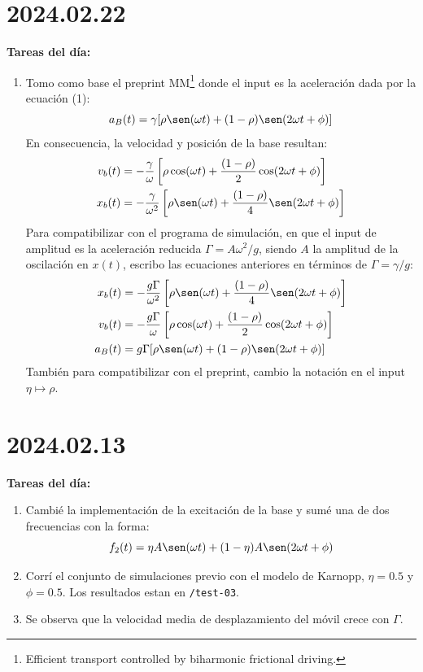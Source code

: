 \documentclass[11pt]{article}
\begin{document}
\section*{2024.02.22}
\textbf{Tareas del día:}
\begin{enumerate}
    \item Tomo como base el preprint MM\footnote{Efficient transport controlled by biharmonic frictional driving.} donde el input es la aceleración dada por la ecuación (1):
        \[ a_B(t) = \gamma [ \rho \sen(\omega t) + (1-\rho) \sen(2 \omega t + \phi)] \]
        En consecuencia, la velocidad y posición de la base resultan:
        \begin{align*}
            v_b(t) &= -\frac{\gamma}{\omega} \left[\rho \cos(\omega t) + \frac{(1 - \rho)}{2} \cos(2 \omega t + \phi)\right] \\
            x_b(t) &= -\frac{\gamma}{\omega^2} \left[ \rho \sen(\omega t) + \frac{(1 - \rho)}{4} \sen(2 \omega t + \phi) \right] 
        \end{align*}
        Para compatibilizar con el programa de simulación, en que el input de amplitud es la aceleración reducida $\Gamma = A \omega^2 / g$, siendo $A$ la amplitud de la oscilación en $x(t)$, escribo las ecuaciones anteriores en términos de $\Gamma = \gamma / g$:
        \begin{align*}
            x_b(t) &= -\frac{g \Gamma}{\omega^2} \left[ \rho \sen(\omega t) + \frac{(1 - \rho)}{4} \sen(2 \omega t + \phi) \right] \\
            v_b(t) &= -\frac{g \Gamma}{\omega} \left[\rho \cos(\omega t) + \frac{(1 - \rho)}{2} \cos(2 \omega t + \phi)\right] \\
            a_B(t) &= g \Gamma [ \rho \sen(\omega t) + (1-\rho) \sen(2 \omega t + \phi)] 
        \end{align*}
        También para compatibilizar con el preprint, cambio la notación en el input $\eta \mapsto \rho$.
\end{enumerate}


\section*{2024.02.13}
\textbf{Tareas del día:}
\begin{enumerate}
    \item Cambié la implementación de la excitación de la base y sumé una de dos frecuencias con la forma:
        \[ f_2(t) = \eta A \sen(\omega t) + (1 - \eta) A \sen(2 \omega t + \phi) \]
    \item Corrí el conjunto de simulaciones previo con el modelo de Karnopp, $\eta = 0.5$ y $\phi = 0.5$. Los resultados estan en \texttt{/test-03}.
    \item Se observa que la velocidad media de desplazamiento del móvil crece con $\Gamma$.
\end{enumerate}
\end{document}
